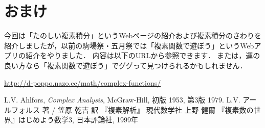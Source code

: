 \documentclass{ltjsarticle}
\theoremstyle{definition}
\theoremstyle{remark}
\begin{document}
\section*{おまけ}

今回は「たのしい複素積分」というWebページの紹介および複素積分のさわりを紹介しましたが，以前の駒場祭・五月祭では「複素関数で遊ぼう」というWebアプリの紹介をやりました．
内容は以下のURLから参照できます．
または，運の良い方なら「複素関数で遊ぼう」でググって見つけられるかもしれません．

\begin{center}
  \url{http://d-poppo.nazo.cc/math/complex-functions/}
\end{center}


\begin{thebibliography}{9}
  L.V. Ahlfors, \emph{Complex Analysis}, McGraw-Hill, 初版 1953, 第3版 1979.
  L.V. アールフォルス 著 / 笠原 乾吉 訳 『複素解析』 現代数学社
  上野 健爾 『複素数の世界』はじめよう数学3, 日本評論社, 1999年
\end{thebibliography}
\end{document}
